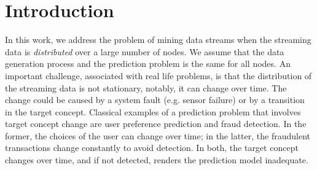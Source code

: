 \documentclass{sig-alternate-05-2015}
\begin{document}


%
%

%
%
\printccsdesc



\section{Introduction}
In this work, we address the problem of mining data streams when the streaming data is 
{\em distributed} over a large number of nodes. We assume that the data generation 
process and the prediction problem is the same for all nodes. An important challenge, 
associated  with real life problems, is that the distribution of the streaming 
data is not stationary, notably, it can change over time. 
The change could be caused by a system fault (e.g. sensor failure) or by a transition 
in the target concept. 
Classical examples of a prediction problem that involves target 
concept change are user preference prediction and fraud detection. 
In the former, the choices of the user can change over time; in the latter, the fraudulent 
transactions change constantly to avoid detection. 
In both, the target concept changes over time, and if not detected, renders the prediction model inadequate.
\end{document}
